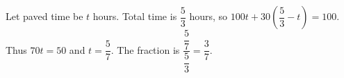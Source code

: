 Let paved time be $t$ hours. Total time is $\dfrac{5}{3}$ hours, so $100t+30(\dfrac{5}{3}-t)=100$. Thus $70t=50$ and $t=\dfrac{5}{7}$. The fraction is $\dfrac{\dfrac{5}{7}}{\dfrac{5}{3}}=\boxed{\dfrac{3}{7}}$.
